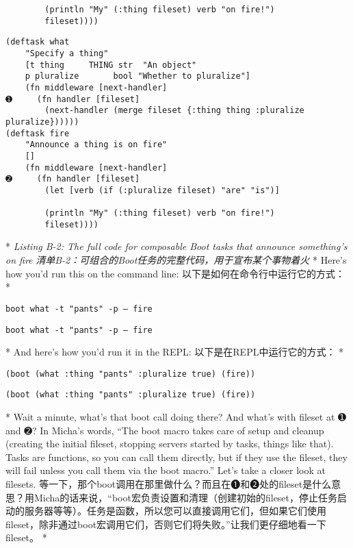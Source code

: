 \begin{paracol}{2}
\begin{verbatim}
        (println "My" (:thing fileset) verb "on fire!")
        fileset))))
\end{verbatim}
\switchcolumn
\begin{verbatim}
(deftask what
    "Specify a thing"
    [t thing     THING str  "An object"
    p pluralize       bool "Whether to pluralize"]
    (fn middleware [next-handler]
➊     (fn handler [fileset]
        (next-handler (merge fileset {:thing thing :pluralize pluralize})))))
(deftask fire
    "Announce a thing is on fire"
    []
    (fn middleware [next-handler]
➋     (fn handler [fileset]
        (let [verb (if (:pluralize fileset) "are" "is")]

        (println "My" (:thing fileset) verb "on fire!")
        fileset))))
\end{verbatim}
\switchcolumn[0]*
\emph{Listing B-2: The full code for composable Boot tasks that announce
something's on fire}
\switchcolumn
\emph{清单B-2：可组合的Boot任务的完整代码，用于宣布某个事物着火}
\switchcolumn[0]*
Here's how you'd run this on the command line:
\switchcolumn
以下是如何在命令行中运行它的方式：
\switchcolumn[0]*
\begin{verbatim}
boot what -t "pants" -p – fire
\end{verbatim}
\switchcolumn
\begin{verbatim}
boot what -t "pants" -p – fire
\end{verbatim}
\switchcolumn[0]*
And here's how you'd run it in the REPL:
\switchcolumn
以下是在REPL中运行它的方式：
\switchcolumn[0]*
\begin{verbatim}
(boot (what :thing "pants" :pluralize true) (fire))
\end{verbatim}
\switchcolumn
\begin{verbatim}
(boot (what :thing "pants" :pluralize true) (fire))
\end{verbatim}

\switchcolumn[0]*
Wait a minute, what's that boot call doing there? And what's with
fileset at ➊ and ➋? In Micha's words, ``The boot macro takes care of
setup and cleanup (creating the initial fileset, stopping servers
started by tasks, things like that). Tasks are functions, so you can
call them directly, but if they use the fileset, they will fail unless
you call them via the boot macro.'' Let's take a closer look at
filesets.
\switchcolumn
等一下，那个boot调用在那里做什么？而且在➊和➋处的fileset是什么意思？用Micha的话来说，``boot宏负责设置和清理（创建初始的fileset，停止任务启动的服务器等等）。任务是函数，所以您可以直接调用它们，但如果它们使用fileset，除非通过boot宏调用它们，否则它们将失败。''让我们更仔细地看一下fileset。
\switchcolumn[0]*

\end{paracol}

